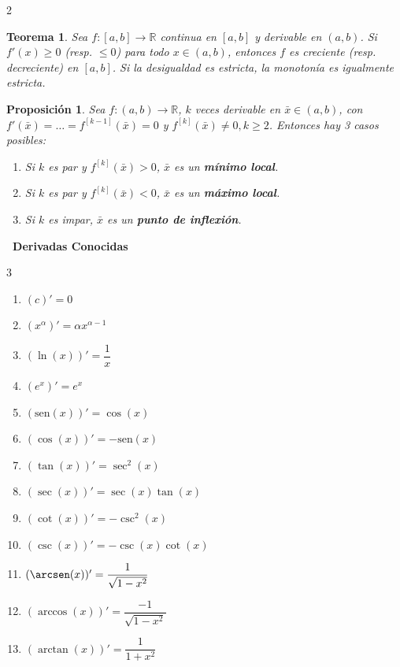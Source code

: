 \documentclass[letterpaper,12pt]{article}
\theoremstyle{plain}
\newtheorem{teo}{Teorema}
\newtheorem{prop}{Proposici\'on}
\theoremstyle{definition}
\newcommand{\sen}{\text{sen}}
\begin{document}
\begin{tcolorbox}[title = Resumen, colframe=cyan!80!black, colback=cyan!5!white, boxrule=0.8pt, arc=4pt, auto outer arc]
\begin{multicols}{2}
\begin{teo} Sea $f : [a, b] \to \mathbb{R}$ continua en $[a, b]$ y derivable en $(a, b)$. Si $f'(x) \ge 0$ (resp. $\le 0$) para todo $x \in (a, b)$, entonces $f$ es creciente (resp. decreciente) en $[a, b]$. Si la desigualdad es estricta, la monotonía es igualmente estricta.
\end{teo}

\begin{prop}
    Sea $f : (a, b) \to \mathbb{R}$, $k$ veces derivable en $\bar{x} \in (a, b)$, con $f'(\bar{x}) = \dots = f^{[k-1]}(\bar{x}) = 0$ y $f^{[k]}(\bar{x}) \neq 0, k \ge 2$. Entonces hay 3 casos posibles:
\begin{enumerate}
    \item Si $k$ es par y $f^{[k]}(\bar{x}) > 0$, $\bar{x}$ es un \textbf{mínimo local}.
    \item Si $k$ es par y $f^{[k]}(\bar{x}) < 0$, $\bar{x}$ es un \textbf{máximo local}.
    \item Si $k$ es impar, $\bar{x}$ es un \textbf{punto de inflexión}.
\end{enumerate}
\end{prop}


\end{multicols}
\end{tcolorbox}

\textbf{\textbullet\ Derivadas Conocidas}
\begin{multicols}{3}
\begin{enumerate}
    \item \( (c)' = 0 \)
    \item \( (x^\alpha)' = \alpha x^{\alpha - 1} \)
    \item \( (\ln(x))' = \dfrac{1}{x} \)
    \item \( (e^x)' = e^x \)
    \item \( (\sen(x))' = \cos(x) \)
    \item \( (\cos(x))' = -\sen(x) \)
    \item \( (\tan(x))' = \sec^2(x) \)
    \item $(\sec(x))' = \sec(x)\tan(x)$
    \item $(\cot(x))' = -\csc^2(x)$
    \item $(\csc(x))' = -\csc(x)\cot(x)$
    \item \( (\arcsen(x))' = \dfrac{1}{\sqrt{1 - x^2}} \)
    \item \( (\arccos(x))' = \dfrac{-1}{\sqrt{1 - x^2}} \)
    \item \( (\arctan(x))' = \dfrac{1}{1 + x^2} \)
\end{enumerate}
\end{multicols}
\end{document}
